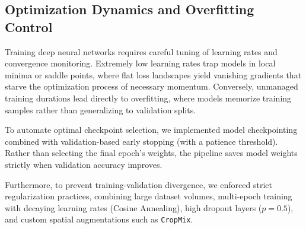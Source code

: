 \subsection{Optimization Dynamics and Overfitting Control}
Training deep neural networks requires careful tuning of learning rates and convergence monitoring. Extremely low learning rates trap models in local minima or saddle points, where flat loss landscapes yield vanishing gradients that starve the optimization process of necessary momentum. Conversely, unmanaged training durations lead directly to overfitting, where models memorize training samples rather than generalizing to validation splits.

To automate optimal checkpoint selection, we implemented model checkpointing combined with validation-based early stopping (with a patience threshold). Rather than selecting the final epoch's weights, the pipeline saves model weights strictly when validation accuracy improves. 

Furthermore, to prevent training-validation divergence, we enforced strict regularization practices, combining large dataset volumes, multi-epoch training with decaying learning rates (Cosine Annealing), high dropout layers ($p = 0.5$), and custom spatial augmentations such as \texttt{CropMix}.





